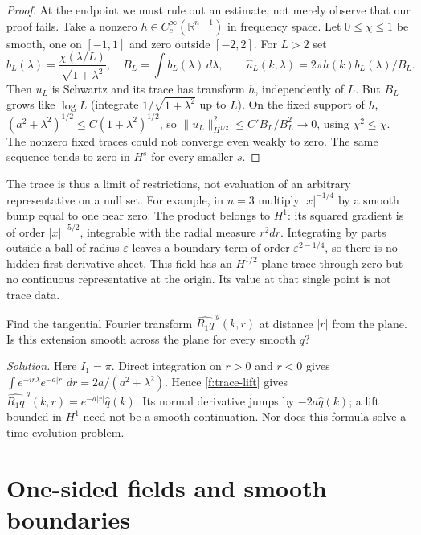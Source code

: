 \begin{proof}
At the endpoint we must rule out an estimate, not merely observe that our proof fails. Take a nonzero $h\in C_c^\infty(\mathbb R^{n-1})$ in frequency space. Let $0\leq\chi\leq1$ be smooth, one on $[-1,1]$ and zero outside $[-2,2]$. For $L>2$ set
\[
 b_L(\lambda)=\frac{\chi(\lambda/L)}{\sqrt{1+\lambda^2}},\quad
 B_L=\int b_L(\lambda)\,d\lambda,\qquad
 \widehat u_L(k,\lambda)=2\pi h(k)b_L(\lambda)/B_L .
\]
Then $u_L$ is Schwartz and its trace has transform $h$, independently of $L$. But $B_L$ grows like $\log L$ (integrate $1/\sqrt{1+\lambda^2}$ up to $L$). On the fixed support of $h$, $(a^2+\lambda^2)^{1/2}\leq C(1+\lambda^2)^{1/2}$, so $\|u_L\|_{H^{1/2}}^2\leq C' B_L/B_L^2\to0$, using $\chi^2\leq\chi$. The nonzero fixed traces could not converge even weakly to zero. The same sequence tends to zero in $H^s$ for every smaller $s$.
\end{proof}

The trace is thus a limit of restrictions, not evaluation of an arbitrary representative on a null set. For example, in $n=3$ multiply $|x|^{-1/4}$ by a smooth bump equal to one near zero. The product belongs to $H^1$: its squared gradient is of order $|x|^{-5/2}$, integrable with the radial measure $r^2dr$. Integrating by parts outside a ball of radius $\varepsilon$ leaves a boundary term of order $\varepsilon^{2-1/4}$, so there is no hidden first-derivative sheet. This field has an $H^{1/2}$ plane trace through zero but no continuous representative at the origin. Its value at that single point is not trace data.

\begin{exercise}[What the right inverse does at $s=1$]
Find the tangential Fourier transform $\widehat{R_1q}^{\,y}(k,r)$ at distance $|r|$ from the plane. Is this extension smooth across the plane for every smooth $q$?
\end{exercise}
\noindent\emph{Solution.} Here $I_1=\pi$. Direct integration on $r>0$ and $r<0$ gives $\int e^{-ir\lambda}e^{-a|r|}\,dr=2a/(a^2+\lambda^2)$. Hence \eqref{f:trace-lift} gives $\widehat{R_1q}^{\,y}(k,r)=e^{-a|r|}\widehat q(k)$. Its normal derivative jumps by $-2a\widehat q(k)$; a lift bounded in $H^1$ need not be a smooth continuation. Nor does this formula solve a time evolution problem.

\section{One-sided fields and smooth boundaries}\label{f:localized-trace}

